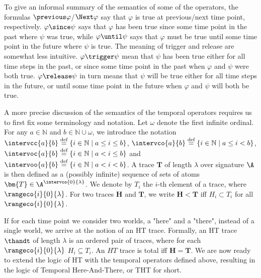 To give an informal summary of the semantics of some of the operators,
the formulas $\previous \varphi$/$\Next \varphi$ say that $\varphi$ is
true at previous/next time point, respectively.  $\varphi \since \psi$
says that $\varphi$ has been true since some time point in the past
where $\psi$ was true, while $\varphi \until \psi$ says that $\varphi$
must be true until some time point in the future where $\psi$ is true.
The meaning of trigger and release are somewhat less
intuitive. $\varphi \trigger \psi$ mean that $\psi$ has been true
either for all time steps in the past, or since some time point in the
past when $\varphi$ and $\psi$ were both true. $\varphi \release \psi$
in turn means that $\psi$ will be true either for all time steps in
the future, or until some time point in the future when $\varphi$ and
$\psi$ will both be true.

A more precise discussion of the semantics of the temporal operators
requires us to first fix some terminology and notation. Let $\omega$
denote the first infinite ordinal. For any $a \in \mathbb{N}$ and
$b \in \mathbb{N} \cup {\omega}$, we introduce the notation
$\intervcc{a}{b} \defeq \{ i \in \mathbb{N} \mid a \leq i \leq b \}$,
$\intervco{a}{b} \defeq \{ i \in \mathbb{N} \mid a \leq i < b \}$,
$\intervoc{a}{b} \defeq \{ i \in \mathbb{N} \mid a < i \leq b \}$ and
$\intervoo{a}{b} \defeq \{ i \in \mathbb{N} \mid a < i < b \}$. A
trace $\bm{T}$ of length $\lambda$ over signature $\A$ is then defined
as a (possibly infinite) sequence of sets of atoms
$\bm{T} \in \A^{\intervco{0}{\lambda}}$. We denote by $T_i$ the $i$-th
element of a trace, where $\rangeco{i}{0}{\lambda}$. For two traces
$\bm{H}$ and $\bm{T}$, we write $\bm{H < T}$ iff $H_i \subset T_i$ for
all $\rangeco{i}{0}{\lambda}$.

If for each time point we consider two worlds, a "here" and a "there",
instead of a single world, we arrive at the notion of an HT
trace. Formally, an HT trace $\thandt$ of length $\lambda$ is an
ordered pair of traces, where for each $\rangeco{i}{0}{\lambda}$
$H_i \subseteq T_i$. An $HT$ trace is total iff $\bm{H} = \bm{T}$. We
are now ready to extend the logic of HT with the temporal operators
defined above, resulting in the logic of Temporal Here-And-There, or
THT for short.


